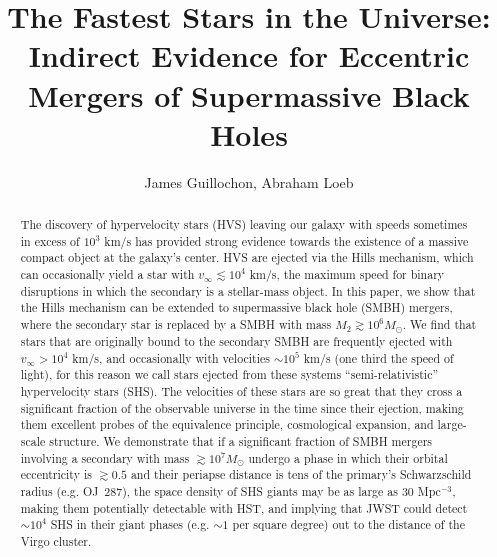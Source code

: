 \documentclass[a4paper,twocolumn]{emulateapj}
\begin{document}


\title{The Fastest Stars in the Universe: Indirect Evidence for Eccentric Mergers of Supermassive Black Holes}

\author{James Guillochon, Abraham Loeb}


\begin{abstract} 
The discovery of hypervelocity stars (HVS) leaving our galaxy with speeds sometimes in excess of $10^{3}$ km/s has provided strong evidence towards the existence of a massive compact object at the galaxy's center. HVS are ejected via the Hills mechanism, which can occasionally yield a star with $v_{\infty} \lesssim 10^4$ km/s, the maximum speed for binary disruptions in which the secondary is a stellar-mass object. In this paper, we show that the Hills mechanism can be extended to supermassive black hole (SMBH) mergers, where the secondary star is replaced by a SMBH with mass $M_2 \gtrsim 10^6 M_{\odot}$. We find that stars that are originally bound to the secondary SMBH are frequently ejected with $v_{\infty} > 10^4$ km/s, and occasionally with velocities $\sim 10^5$ km/s (one third the speed of light), for this reason we call stars ejected from these systems ``semi-relativistic'' hypervelocity stars (SHS). The velocities of these stars are so great that they cross a significant fraction of the observable universe in the time since their ejection, making them excellent probes of the equivalence principle, cosmological expansion, and large-scale structure. We demonstrate that if a significant fraction of SMBH mergers involving a secondary with mass $\gtrsim 10^7 M_\odot$ undergo a phase in which their orbital eccentricity is $\gtrsim 0.5$ and their periapse distance is tens of the primary's Schwarzschild radius (e.g. OJ~287), the space density of SHS giants may be as large as 30 Mpc$^{-3}$, making them potentially detectable with HST, and implying that JWST could detect $\sim 10^4$ SHS in their giant phases (e.g. $\sim 1$ per square degree) out to the distance of the Virgo cluster.
\end{abstract}

\end{document}
